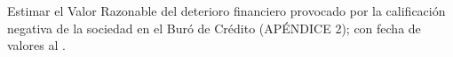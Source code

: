Estimar el Valor Razonable del \textcolor{principal}{deterioro financiero} provocado por la calificación negativa de la sociedad en el Buró de Crédito (APÉNDICE 2); con fecha de valores al  \textcolor{principal}{\fechaValores}.